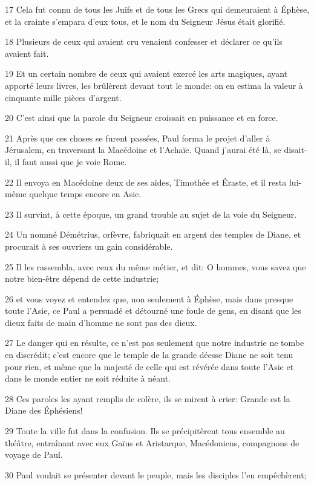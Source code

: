\par 17 Cela fut connu de tous les Juifs et de tous les Grecs qui demeuraient à Éphèse, et la crainte s'empara d'eux tous, et le nom du Seigneur Jésus était glorifié.
\par 18 Plusieurs de ceux qui avaient cru venaient confesser et déclarer ce qu'ils avaient fait.
\par 19 Et un certain nombre de ceux qui avaient exercé les arts magiques, ayant apporté leurs livres, les brûlèrent devant tout le monde: on en estima la valeur à cinquante mille pièces d'argent.
\par 20 C'est ainsi que la parole du Seigneur croissait en puissance et en force.
\par 21 Après que ces choses se furent passées, Paul forma le projet d'aller à Jérusalem, en traversant la Macédoine et l'Achaïe. Quand j'aurai été là, se disait-il, il faut aussi que je voie Rome.
\par 22 Il envoya en Macédoine deux de ses aides, Timothée et Éraste, et il resta lui-même quelque temps encore en Asie.
\par 23 Il survint, à cette époque, un grand trouble au sujet de la voie du Seigneur.
\par 24 Un nommé Démétrius, orfèvre, fabriquait en argent des temples de Diane, et procurait à ses ouvriers un gain considérable.
\par 25 Il les rassembla, avec ceux du même métier, et dit: O hommes, vous savez que notre bien-être dépend de cette industrie;
\par 26 et vous voyez et entendez que, non seulement à Éphèse, mais dans presque toute l'Asie, ce Paul a persuadé et détourné une foule de gens, en disant que les dieux faits de main d'homme ne sont pas des dieux.
\par 27 Le danger qui en résulte, ce n'est pas seulement que notre industrie ne tombe en discrédit; c'est encore que le temple de la grande déesse Diane ne soit tenu pour rien, et même que la majesté de celle qui est révérée dans toute l'Asie et dans le monde entier ne soit réduite à néant.
\par 28 Ces paroles les ayant remplis de colère, ils se mirent à crier: Grande est la Diane des Éphésiens!
\par 29 Toute la ville fut dans la confusion. Ils se précipitèrent tous ensemble au théâtre, entraînant avec eux Gaïus et Aristarque, Macédoniens, compagnons de voyage de Paul.
\par 30 Paul voulait se présenter devant le peuple, mais les disciples l'en empêchèrent;
